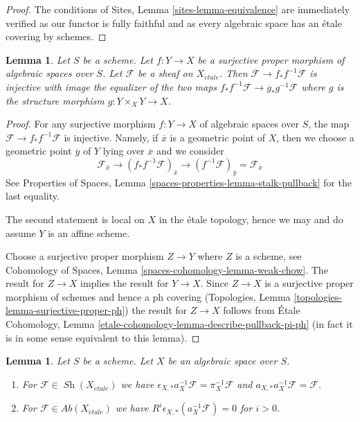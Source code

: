 \documentclass{stacks-project}
\theoremstyle{plain}
\newtheorem{lemma}[subsection]{Lemma}
\theoremstyle{definition}
\theoremstyle{remark}
\numberwithin{equation}{subsection}
\def\Sh{\mathop{\mathit{Sh}}\nolimits}
\def\etale{{\acute{e}tale}}
\begin{document}
\begin{proof}
The conditions of Sites, Lemma \ref{sites-lemma-equivalence}
are immediately verified as our functor is fully faithful
and as every algebraic space has an \'etale covering by schemes.
\end{proof}

\begin{lemma}
\label{lemma-surjective-proper}
Let $S$ be a scheme. Let $f : Y \to X$ be a surjective proper morphism
of algebraic spaces over $S$. Let $\mathcal{F}$ be a sheaf on $X_\etale$.
Then $\mathcal{F} \to f_*f^{-1}\mathcal{F}$ is injective with
image the equalizer of the two maps
$f_*f^{-1}\mathcal{F} \to g_*g^{-1}\mathcal{F}$ where
$g$ is the structure morphism $g : Y \times_X Y \to X$.
\end{lemma}

\begin{proof}
For any surjective morphism $f : Y \to X$ of algebraic spaces over $S$,
the map $\mathcal{F} \to f_*f^{-1}\mathcal{F}$ is injective.
Namely, if $\overline{x}$ is a geometric point of $X$, then we
choose a geometric point $\overline{y}$ of $Y$ lying over $\overline{x}$
and we consider
$$
\mathcal{F}_{\overline{x}} \to
(f_*f^{-1}\mathcal{F})_{\overline{x}} \to
(f^{-1}\mathcal{F})_{\overline{y}} = \mathcal{F}_{\overline{x}}
$$
See Properties of Spaces, Lemma \ref{spaces-properties-lemma-stalk-pullback}
for the last equality.

\medskip\noindent
The second statement is local on $X$ in the \'etale topology, hence we may
and do assume $Y$ is an affine scheme.

\medskip\noindent
Choose a surjective proper morphism $Z \to Y$ where $Z$ is a scheme, see
Cohomology of Spaces, Lemma \ref{spaces-cohomology-lemma-weak-chow}.
The result for $Z \to X$ implies the result for $Y \to X$.
Since $Z \to X$ is a surjective proper morphism of schemes
and hence a ph covering
(Topologies, Lemma \ref{topologies-lemma-surjective-proper-ph})
the result for $Z \to X$ follows from
\'Etale Cohomology, Lemma \ref{etale-cohomology-lemma-describe-pullback-pi-ph}
(in fact it is in some sense equivalent to this lemma).
\end{proof}

\begin{lemma}
\label{lemma-comparison-fppf-etale}
Let $S$ be a scheme. Let $X$ be an algebraic space over $S$.
\begin{enumerate}
\item For $\mathcal{F} \in \Sh(X_\etale)$ we have
$\epsilon_{X, *}a_X^{-1}\mathcal{F} = \pi_X^{-1}\mathcal{F}$
and $a_{X, *}a_X^{-1}\mathcal{F} = \mathcal{F}$.
\item For $\mathcal{F} \in \textit{Ab}(X_\etale)$ we have
$R^i\epsilon_{X, *}(a_X^{-1}\mathcal{F}) = 0$ for $i > 0$.
\end{enumerate}
\end{lemma}
\end{document}
